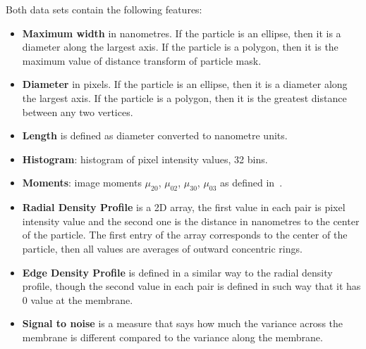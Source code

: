 \documentclass[a4paper, 11pt, table]{article}
\begin{document}
\begin{minipage}{\linewidth}
Both data sets contain the following features:
\begin{itemize}
\item \textbf{Maximum width} in nanometres. If the particle is an ellipse, then it is a diameter along the largest axis. If the particle is a polygon, then it is the maximum value of distance transform of particle mask.

\item \textbf{Diameter} in pixels. If the particle is an ellipse, then it is a diameter along the largest axis. If the particle is a polygon, then it is the greatest distance between any two vertices. 

\item \textbf{Length} is defined as diameter converted to nanometre units.

\item \textbf{Histogram}: histogram of pixel intensity values, 32 bins.

\item \textbf{Moments}: image moments $\mu_{20}$, $\mu_{02}$, $\mu_{30}$, $\mu_{03}$ as defined in~\cite{1057692}. 

\item \textbf{Radial Density Profile} is a 2D array, the first value in each pair is pixel intensity value and the second one is the distance in nanometres to the center of the particle. The first entry of the array corresponds to the center of the particle, then all values are averages of outward concentric rings.

\item \textbf{Edge Density Profile} is defined in a similar way to the radial density profile, though the second value in each pair is defined in such way that it has 0 value at the membrane.

\item \textbf{Signal to noise} is a measure that says how much the variance across the membrane is different compared to the variance along the membrane.
\end{itemize}
\end{minipage}
\end{document}
